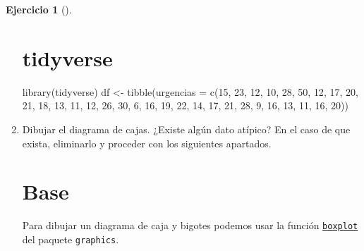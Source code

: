 \documentclass[
  spanish,
  a4paper,
]{scrreport}
\newenvironment{Shaded}{\begin{snugshade}}{\end{snugshade}}
\newcommand{\AttributeTok}[1]{\textcolor[rgb]{0.40,0.45,0.13}{#1}}
\newcommand{\DecValTok}[1]{\textcolor[rgb]{0.68,0.00,0.00}{#1}}
\newcommand{\FunctionTok}[1]{\textcolor[rgb]{0.28,0.35,0.67}{#1}}
\newcommand{\NormalTok}[1]{\textcolor[rgb]{0.00,0.23,0.31}{#1}}
\newcommand{\OtherTok}[1]{\textcolor[rgb]{0.00,0.23,0.31}{#1}}
\theoremstyle{definition}
\newtheorem{exercise}{Ejercicio}[chapter]
\theoremstyle{remark}
\begin{document}
\begin{exercise}[]
\begin{enumerate}
\begin{tcolorbox}
  \section{tidyverse}

\begin{Shaded}
\begin{Highlighting}[]
\FunctionTok{library}\NormalTok{(tidyverse)}
\NormalTok{df }\OtherTok{\textless{}{-}} \FunctionTok{tibble}\NormalTok{(}\AttributeTok{urgencias =} \FunctionTok{c}\NormalTok{(}\DecValTok{15}\NormalTok{, }\DecValTok{23}\NormalTok{, }\DecValTok{12}\NormalTok{, }\DecValTok{10}\NormalTok{, }\DecValTok{28}\NormalTok{, }\DecValTok{50}\NormalTok{, }\DecValTok{12}\NormalTok{, }\DecValTok{17}\NormalTok{, }\DecValTok{20}\NormalTok{, }\DecValTok{21}\NormalTok{, }\DecValTok{18}\NormalTok{, }\DecValTok{13}\NormalTok{, }\DecValTok{11}\NormalTok{, }\DecValTok{12}\NormalTok{, }\DecValTok{26}\NormalTok{, }\DecValTok{30}\NormalTok{, }\DecValTok{6}\NormalTok{, }\DecValTok{16}\NormalTok{, }\DecValTok{19}\NormalTok{, }\DecValTok{22}\NormalTok{, }\DecValTok{14}\NormalTok{, }\DecValTok{17}\NormalTok{, }\DecValTok{21}\NormalTok{, }\DecValTok{28}\NormalTok{, }\DecValTok{9}\NormalTok{, }\DecValTok{16}\NormalTok{, }\DecValTok{13}\NormalTok{, }\DecValTok{11}\NormalTok{, }\DecValTok{16}\NormalTok{, }\DecValTok{20}\NormalTok{))}
\end{Highlighting}
\end{Shaded}

  \end{tcolorbox}
\item
  Dibujar el diagrama de cajas. ¿Existe algún dato atípico? En el caso
  de que exista, eliminarlo y proceder con los siguientes apartados.

  \begin{tcolorbox}[enhanced jigsaw, breakable, leftrule=.75mm, toptitle=1mm, rightrule=.15mm, opacitybacktitle=0.6, left=2mm, colframe=quarto-callout-tip-color-frame, titlerule=0mm, toprule=.15mm, opacityback=0, bottomtitle=1mm, coltitle=black, colbacktitle=quarto-callout-tip-color!10!white, title=\textcolor{quarto-callout-tip-color}{\faLightbulb}\hspace{0.5em}{Solución}, arc=.35mm, bottomrule=.15mm, colback=white]

  \section{Base}

  Para dibujar un diagrama de caja y bigotes podemos usar la función
  \href{https://www.rdocumentation.org/packages/graphics/versions/3.6.2/topics/boxplot}{\texttt{boxplot}}
  del paquete \texttt{graphics}.


\end{tcolorbox}
\end{enumerate}
\end{exercise}
\end{document}
